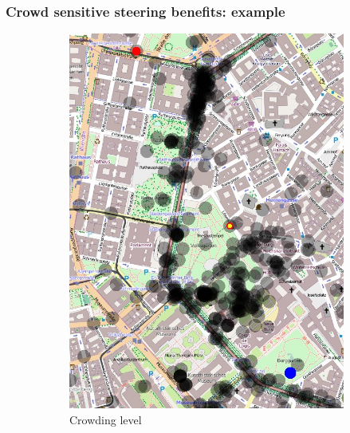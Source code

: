 \documentclass[presentation]{beamer}
\begin{document}
\begin{frame}\frametitle{Crowd sensitive steering benefits: example}
  \begin{figure}
  \begin{subfigure}[b]{0.325\textwidth}
   \includegraphics[width=\textwidth]{img/crowd}
   \caption{Crowding level}
   \label{img:crowd}
  \end{subfigure}
  \begin{subfigure}[b]{0.325\textwidth}

\end{subfigure}
\end{figure}
\end{frame}
\end{document}
